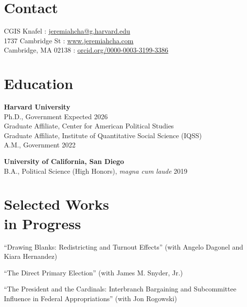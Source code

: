 \documentclass[margin, line]{res}
\begin{document}
\begin{resume}

\section{Contact}
CGIS Knafel \hfill \Letter: \href{mailto:jeremiahcha@g.harvard.edu}{jeremiahcha@g.harvard.edu}\\
1737 Cambridge St \hfill \Mundus: \href{httsp://www.jeremiahcha.com}{www.jeremiahcha.com}\\
Cambridge, MA 02138 \hfill \Mundus: \href{https://orcid.org/0000-0003-3199-3386}{orcid.org/0000-0003-3199-3386}

\section{Education}
\textbf{Harvard University}\\
\hspace*{5mm} Ph.D., Government \hfill Expected 2026\\
\hspace*{10mm}Graduate Affiliate, Center for American Political Studies\\
\hspace*{10mm}Graduate Affiliate, Institute of Quantitative Social Science (IQSS)\\
\hspace*{5mm} A.M., Government \hfill 2022

\textbf{University of California, San Diego}\\
\hspace*{5mm} B.A., Political Science (High Honors), \textit{magna cum laude} \hfill 2019

\section{Selected Works \\in Progress}
\begin{etaremune}
	\item ``Drawing Blanks: Redistricting and Turnout Effects'' (with Angelo Dagonel and Kiara Hernandez)
	\item ``The Direct Primary Election'' (with James M. Snyder, Jr.)
	\item ``The President and the Cardinals: Interbranch Bargaining and Subcommittee Influence in Federal Appropriations'' (with Jon Rogowski)
\end{etaremune}


\end{resume}
\end{document}
